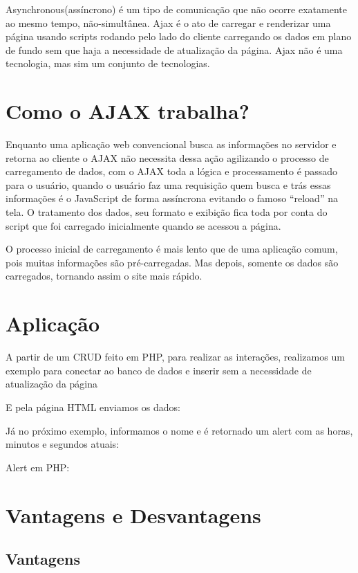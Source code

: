 \documentclass[12pt,a4paper]{article}
\begin{document}
Asynchronous(assíncrono) é um tipo de comunicação que não ocorre exatamente ao mesmo tempo, não-simultânea. Ajax é o ato de carregar e renderizar uma página usando scripts rodando pelo lado do cliente carregando os dados em plano de fundo sem que haja a necessidade de atualização da página. Ajax não é uma tecnologia, mas sim um conjunto de tecnologias.

\section{Como o AJAX trabalha?}

Enquanto uma aplicação web convencional busca as informações no servidor e retorna ao cliente o AJAX não necessita dessa ação agilizando o processo de carregamento de dados, com o AJAX  toda a lógica e processamento é passado para o usuário, quando o usuário faz uma requisição quem busca e trás essas informações é o JavaScript de forma assíncrona evitando o famoso “reload” na tela. O tratamento dos dados, seu formato e exibição fica toda por conta do script que foi carregado inicialmente quando se acessou a página.

O processo inicial de carregamento é mais lento que de uma aplicação comum, pois muitas informações são pré-carregadas. Mas depois, somente os dados são carregados, tornando assim o site mais rápido.

\section{Aplicação}
A partir de um CRUD feito em PHP, para realizar as interações, realizamos um exemplo para conectar ao banco de dados e inserir sem a necessidade de atualização da página


E pela página HTML enviamos os dados:

 
Já no próximo exemplo, informamos o nome e é retornado um alert com as horas, minutos e segundos atuais:

Alert em PHP:




\section{Vantagens e Desvantagens}
\subsection{Vantagens}
\end{document}
